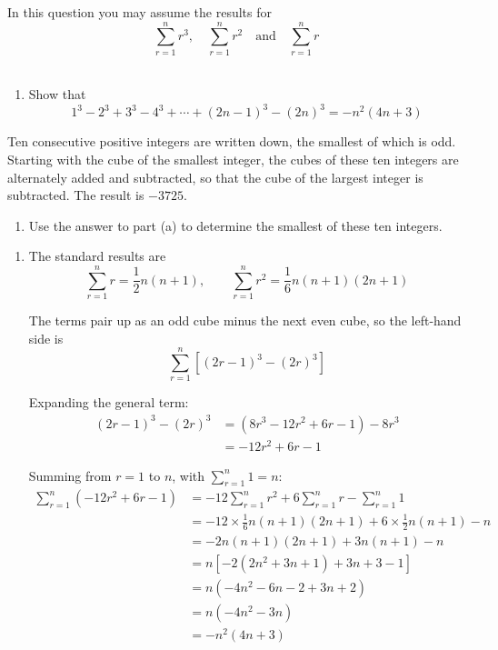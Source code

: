 \documentclass[leqno]{article}
\begin{document}
\begin{enumerate}[
  label=\textbf{\arabic*.},
  leftmargin=*,
  topsep=0pt,
  partopsep=0pt,
  parsep=0pt
]
In this question you may assume the results for
\[\sum_{r=1}^{n} r^3, \quad \sum_{r=1}^{n} r^2 \quad \text{and} \quad \sum_{r=1}^{n} r\] \\
\begin{enumerate}[label=\textbf{(\alph*)}]
  \item Show that
  \[1^3 - 2^3 + 3^3 - 4^3 + \cdots + (2n-1)^3 - (2n)^3 = -n^2(4n+3)\] 
\end{enumerate}
Ten consecutive positive integers are written down, the smallest of which is odd. Starting with the cube of the smallest integer, the cubes of these ten integers are alternately added and subtracted, so that the cube of the largest integer is subtracted. The result is $-3725$. \\
\begin{enumerate}[label=\textbf{(\alph*)}, resume]
  \item Use the answer to part (a) to determine the smallest of these ten integers.  \\
\end{enumerate}

\vspace*{10pt}

\begin{djsSolution}
\begin{enumerate}[label=\textbf{(\alph*)}, start=1]
  \item The standard results are
\[
\sum_{r=1}^{n} r=\frac12 n(n+1),\qquad \sum_{r=1}^{n} r^2=\frac16 n(n+1)(2n+1)
\]

The terms pair up as an odd cube minus the next even cube, so the left-hand side is
\[
\sum_{r=1}^{n}\left[(2r-1)^3-(2r)^3\right]
\]

Expanding the general term:
\begin{align*}
(2r-1)^3-(2r)^3&=\left(8r^3-12r^2+6r-1\right)-8r^3\\
&=-12r^2+6r-1
\end{align*}

Summing from \(r=1\) to \(n\), with \(\sum_{r=1}^{n} 1=n\):
\begin{align*}
\sum_{r=1}^{n}\left(-12r^2+6r-1\right)&=-12\sum_{r=1}^{n}r^2+6\sum_{r=1}^{n}r-\sum_{r=1}^{n}1\\
&=-12\times\frac16 n(n+1)(2n+1)+6\times\frac12 n(n+1)-n\\
&=-2n(n+1)(2n+1)+3n(n+1)-n\\
&=n\left[-2\left(2n^2+3n+1\right)+3n+3-1\right]\\
&=n\left(-4n^2-6n-2+3n+2\right)\\
&=n\left(-4n^2-3n\right)\\
&=-n^2(4n+3)
\end{align*}


\end{enumerate}
\end{djsSolution}
\end{enumerate}
\end{document}
